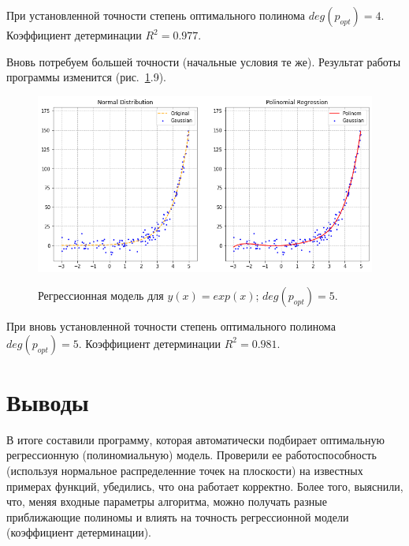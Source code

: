 \documentclass[12pt, a4paper]{article}
\begin{document}
    При установленной точности степень оптимального полинома $deg(p_{opt}) = 
    4$. Коэффициент детерминации $R^{2} = 0.977$.
    
    Вновь потребуем большей точности (начальные условия те же). Результат 
    работы программы изменится (рис.~\ref{image49}.9).
    
    \begin{figure}[h!]
        \center
        \includegraphics[width = 14cm]{f5_3.png}
        \label{image49}
        \caption{Регрессионная модель для $y(x) = exp(x)$; $deg(p_{opt}) = 
            5$.}
    \end{figure}
    
    При вновь установленной точности степень оптимального полинома 
    $deg(p_{opt}) = 5$. Коэффициент детерминации $R^{2} = 0.981$.
    
    \section{Выводы}
    
    В итоге составили программу, которая автоматически подбирает оптимальную 
    регрессионную (полиномиальную) модель. Проверили ее работоспособность 
    (используя нормальное распределенние точек на плоскости) на известных 
    примерах функций, убедились, что она работает корректно. Более того, 
    выяснили, что, меняя входные параметры алгоритма, можно получать разные 
    приближающие полиномы и влиять на точность регрессионной модели 
    (коэффициент детерминации).
    
\end{document}
